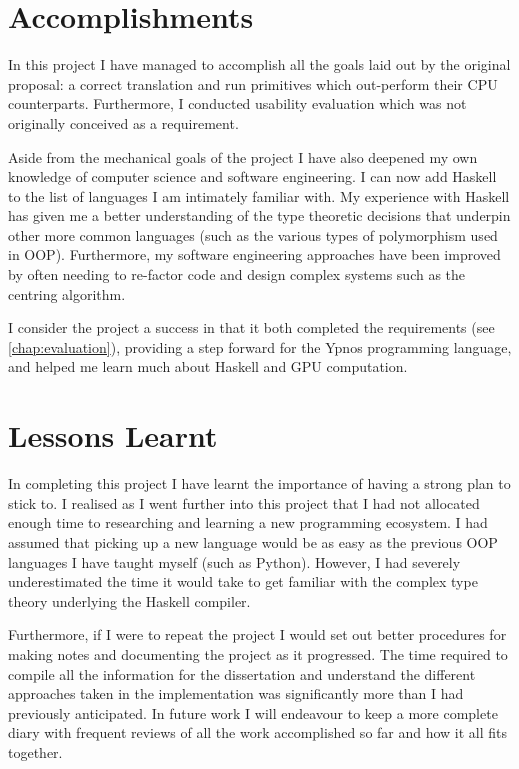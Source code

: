 \documentclass[
    12pt,
    a4paper,
    twoside,
    openright,
    ]{scrbook}
\begin{document}
\section{Accomplishments}

In this project I have managed to accomplish all the goals laid out by the
original proposal: a correct translation and run primitives which out-perform
their CPU counterparts. Furthermore, I conducted usability evaluation which was
not originally conceived as a requirement.

Aside from the mechanical goals of the project I have also deepened my own
knowledge of computer science and software engineering. I can now add Haskell to
the list of languages I am intimately familiar with. My experience with Haskell
has given me a better understanding of the type theoretic decisions that
underpin other more common languages (such as the various types of polymorphism
used in OOP). Furthermore, my software engineering approaches have been improved
by often needing to re-factor code and design complex systems such as the
centring algorithm.

I consider the project a success in that it both completed the requirements (see
\autoref{chap:evaluation}), providing a step forward for the Ypnos programming
language, and helped me learn much about Haskell and GPU computation.

\section{Lessons Learnt}

In completing this project I have learnt the importance of having a strong plan
to stick to. I realised as I went further into this project that I had not
allocated enough time to researching and learning a new programming ecosystem. I
had assumed that picking up a new language would be as easy as the previous OOP
languages I have taught myself (such as Python). However, I had severely
underestimated the time it would take to get familiar with the complex type
theory underlying the Haskell compiler.

Furthermore, if I were to repeat the project I would set out better procedures
for making notes and documenting the project as it progressed. The time required
to compile all the information for the dissertation and understand the different
approaches taken in the implementation was significantly more than I had
previously anticipated. In future work I will endeavour to keep a more complete
diary with frequent reviews of all the work accomplished so far and how it all
fits together.
\end{document}
